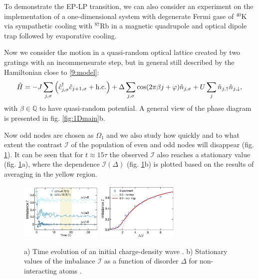 To demonstrate the EP-LP transition, we can also consider an experiment on the implementation of a one-dimensional system \cite{schreiber_observation_2015} with degenerate Fermi gase of ${}^{40}$K via sympathetic cooling with ${}^{87}$Rb in a magnetic quadrupole and optical dipole trap followed by evaporative cooling. 

Now we consider the motion in a quasi-random optical lattice created by two gratings with an incommensurate step, but in general still described by the Hamiltonian close to \eqref{9:model}:
\begin{equation*}
         \hat{H} = - J \sum_{j,\sigma} \left(\hat{c}^{\dag}_{j,\sigma} \hat{c}_{j+1,\sigma} + \textnormal{h.c.} \right) + \Delta \sum_{j, \sigma} \cos(2 \pi \beta j + \varphi) \hat{n}_{j, \sigma} + U \sum_j \hat{n}_{j, \uparrow} \hat{n}_{j, \downarrow},
\end{equation*} 
with $\beta \in \mathbb{Q}$ to have quasi-random potential.  A general view of the phase diagram is presented in fig. \ref{fig:1Dmain}b.


Now odd nodes are chosen as $\Omega_1$ and we also study how quickly and to what extent the contrast $\mathcal{I}$ of the population of even and odd nodes will disappear (fig. \ref{fig:loc1D1}). It can be seen that for $t \approx 15 \tau$ the observed $\mathcal{I}$ also reaches a stationary value (fig. \ref{fig:loc1D1}a), where the dependence $\mathcal{I}(\Delta)$ (fig. \ref{fig:loc1D1}b) is plotted based on the results of averaging in the yellow region.

\begin{figure}[h]
    \centering
    \includegraphics[align=c, width=0.35\textwidth]{imgs/MBL_exp_1.png}
    \hspace{10 mm} 
    \includegraphics[align=c, width=0.35\textwidth]{imgs/MBL_exp_2.png}
    \caption{
    \cite{schreiber_observation_2015} 
    a) Time evolution of an initial charge-density wave
    . 
    b) Stationary values of the imbalance $\mathcal{I}$ as a function of disorder $\Delta$ for non-interacting atoms 
    .
    }
    \label{fig:loc1D1}
\end{figure} 

